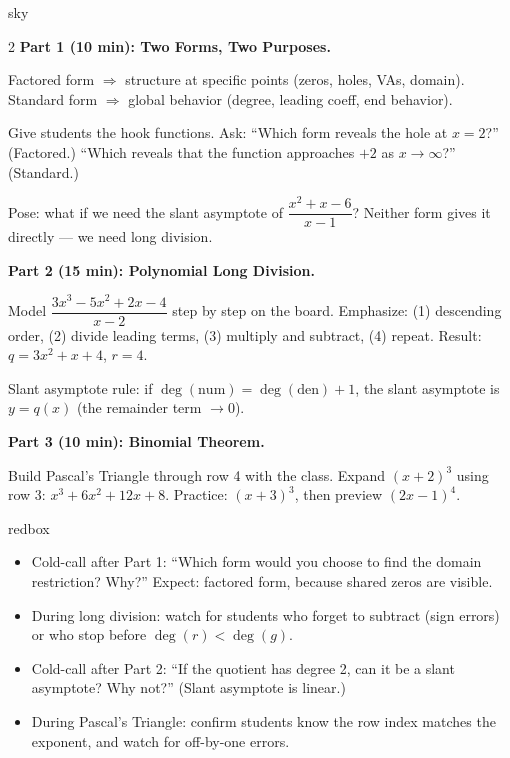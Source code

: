 \documentclass[10pt]{article}
\begin{document}
\begin{skillbox}[Lesson]{sky}
\begin{multicols}{2}
\textbf{Part 1 (10 min): Two Forms, Two Purposes.}

Factored form $\Rightarrow$ structure at specific points (zeros, holes, VAs, domain).
Standard form $\Rightarrow$ global behavior (degree, leading coeff, end behavior).

Give students the hook functions. Ask: ``Which form reveals the hole at $x = 2$?''
(Factored.) ``Which reveals that the function approaches $+2$ as $x\to\infty$?'' (Standard.)

Pose: what if we need the slant asymptote of $\dfrac{x^2+x-6}{x-1}$? Neither form gives
it directly --- we need long division.

\columnbreak

\textbf{Part 2 (15 min): Polynomial Long Division.}

Model $\dfrac{3x^3-5x^2+2x-4}{x-2}$ step by step on the board.
Emphasize: (1) descending order, (2) divide leading terms, (3) multiply and subtract,
(4) repeat. Result: $q = 3x^2+x+4$, $r = 4$.

Slant asymptote rule: if $\deg(\text{num}) = \deg(\text{den}) + 1$, the slant asymptote
is $y = q(x)$ (the remainder term $\to 0$).

\textbf{Part 3 (10 min): Binomial Theorem.}

Build Pascal's Triangle through row 4 with the class. Expand $(x+2)^3$ using row 3:
$x^3 + 6x^2 + 12x + 8$. Practice: $(x+3)^3$, then preview $(2x-1)^4$.
\end{multicols}
\end{skillbox}

\begin{skillbox}{redbox}
\begin{itemize}[leftmargin=1.2em,itemsep=2pt,topsep=0pt]
  \item Cold-call after Part 1: ``Which form would you choose to find the domain restriction?
        Why?'' Expect: factored form, because shared zeros are visible.
  \item During long division: watch for students who forget to subtract (sign errors) or who
        stop before $\deg(r) < \deg(g)$.
  \item Cold-call after Part 2: ``If the quotient has degree 2, can it be a slant asymptote?
        Why not?'' (Slant asymptote is linear.)
  \item During Pascal's Triangle: confirm students know the row index matches the exponent,
        and watch for off-by-one errors.
\end{itemize}
\end{skillbox}
\end{document}
